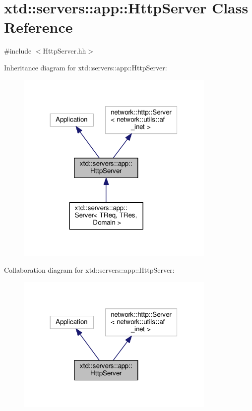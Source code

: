 \hypertarget{classxtd_1_1servers_1_1app_1_1HttpServer}{}\section{xtd\+:\+:servers\+:\+:app\+:\+:Http\+Server Class Reference}
\label{classxtd_1_1servers_1_1app_1_1HttpServer}


{\ttfamily \#include $<$Http\+Server.\+hh$>$}



Inheritance diagram for xtd\+:\+:servers\+:\+:app\+:\+:Http\+Server\+:
\nopagebreak
\begin{figure}[H]
\begin{center}
\leavevmode
\includegraphics[width=272pt]{classxtd_1_1servers_1_1app_1_1HttpServer__inherit__graph}
\end{center}
\end{figure}


Collaboration diagram for xtd\+:\+:servers\+:\+:app\+:\+:Http\+Server\+:
\nopagebreak
\begin{figure}[H]
\begin{center}
\leavevmode
\includegraphics[width=272pt]{classxtd_1_1servers_1_1app_1_1HttpServer__coll__graph}
\end{center}
\end{figure}
